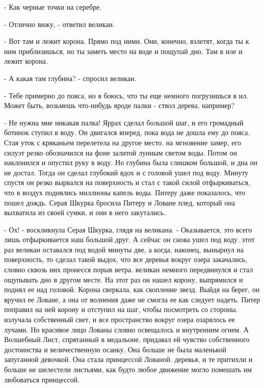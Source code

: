 - Как черные точки на серебре.
\par- Отлично вижу, - ответил великан.
\par- Вот там и лежит корона. Прямо под ними. Они, конечно, взлетят, 
когда ты к ним приблизишься, но ты заметь место на воде и пощупай дно. 
Там в иле и лежит корона.
\par- А какая там глубина? - спросил великан.
\par- Тебе примерно до пояса, но я боюсь, что ты еще немного 
погрузишься в ил. Может быть, возьмешь что-нибудь вроде палки - ствол 
дерева, например?
\par- Не нужна мне никакая палка!
 Яррах сделал большой шаг, и его громадный ботинок ступил в 
воду. Он двигался вперед, пока вода не дошла ему до пояса. Стая уток с 
кряканьем перелетела на другое место.
 на мгновение замер, его силуэт резко обозначился на фоне 
залитой лунным светом воды. Потом он наклонился и опустил руку в воду. 
Но глубина была слишком большой, и дна он не достал. Тогда он сделал 
глубокий вдох и с головой ушел под воду. Минуту спустя он резко 
вырвался на поверхность и стал с такой силой отфыркиваться, что в 
воздух поднялись миллионы капель воды.
 Питеру даже показалось, что пошел дождь. Серая Шкурка 
бросила Питеру и Ловане плед, который она выхватила из своей сумки, и 
они в него закутались.
\par- Ох! - воскликнула Серая Шкурка, глядя на великана. - 
Оказывается, это всего лишь отфыркивается наш большой друг. А сейчас 
он снова ушел под воду.
 этот раз великан оставался под водой минуты две, а когда, 
наконец, вынырнул на поверхность, то сделал такой выдох, что все 
деревья вокруг озера закачались, словно сквозь них пронесся порыв 
ветра.
 великан немного передвинулся и стал ощупывать дно в другом 
месте. На этот раз он нашел корону, выпрямился и поднял ее над 
головой. Корона сверкала, как скопление звезд. Выйдя на берег, он 
вручил ее Ловане, а она от волнения даже не смогла ее как следует 
надеть. Питер поправил на ней корону и отступил на шаг, чтобы 
посмотреть со стороны.
 излучала собственный свет, и все пространство вокруг озера 
озарялось ее лучами. Но красивое лицо Лованы словно освещалось и 
внутренним огнем. А Волшебный Лист, спрятанный в медальоне, придавал 
ей чувство собственного достоинства и величественную осанку. Она 
больше не была маленькой запуганной девочкой. Она стала принцессой 
Лованой.
 деревья, и те притихли и больше не шелестели листьями, как 
будто любое движение могло помешать им любоваться принцессой.
